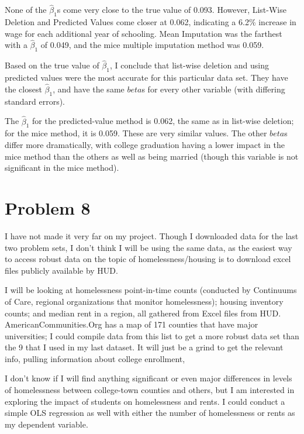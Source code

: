 \documentclass[12pt]{article}
\begin{document}
None of the $\hat{\beta}_1$s come very close to the true value of 0.093. However, List-Wise Deletion and Predicted Values come closer at 0.062, indicating a 6.2\% increase in wage for each additional year of schooling. Mean Imputation was the farthest with a $\hat{\beta}_1$ of 0.049, and the mice multiple imputation method was 0.059. 

Based on the true value of $\hat{\beta}_1$, I conclude that list-wise deletion and using predicted values were the most accurate for this particular data set. They have the closest $\hat{\beta}_1$, and have the same $beta$s for every other variable (with differing standard errors). 

The $\hat{\beta}_1$ for the predicted-value method is 0.062, the same as in list-wise deletion; for the mice method, it is 0.059. These are very similar values. The other $beta$s differ more dramatically, with college graduation having a lower impact in the mice method than the others as well as being married (though this variable is not significant in the mice method). 

\section{Problem 8}

I have not made it very far on my project. Though I downloaded data for the last two problem sets, I don't think I will be using the same data, as the easiest way to access robust data on the topic of homelessness/housing is to download excel files publicly available by HUD. 

I will be looking at homelessness point-in-time counts (conducted by Continuums of Care, regional organizations that monitor homelessness); housing inventory counts; and median rent in a region, all gathered from Excel files from HUD. AmericanCommunities.Org has a map of 171 counties that have major universities; I could compile data from this list to get a more robust data set than the 9 that I used in my last dataset. It will just be a grind to get the relevant info, pulling information about college enrollment, 

I don't know if I will find anything significant or even major differences in levels of homelessness between college-town counties and others, but I am interested in exploring the impact of students on homelessness and rents. I could conduct a simple OLS regression as well with either the number of homelessness or rents as my dependent variable.
\end{document}
